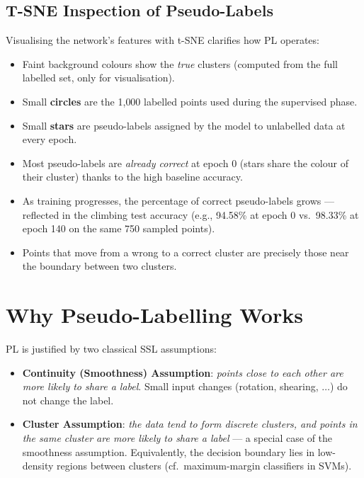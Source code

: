 \documentclass[11pt,a4paper]{article}
\theoremstyle{definition}
\theoremstyle{plain}
\theoremstyle{remark}
\begin{document}
\subsection{T-SNE Inspection of Pseudo-Labels}

Visualising the network's features with t-SNE clarifies how PL operates:
\begin{itemize}
    \item Faint background colours show the \emph{true} clusters (computed from the full labelled set, only for visualisation).
    \item Small \textbf{circles} are the 1{,}000 labelled points used during the supervised phase.
    \item Small \textbf{stars} are pseudo-labels assigned by the model to unlabelled data at every epoch.
\end{itemize}

\begin{tcolorbox}[colback=green!5!white,colframe=green!60!black,title=\textbf{Observations}]
\begin{itemize}[leftmargin=*]
    \item Most pseudo-labels are \emph{already correct} at epoch 0 (stars share the colour of their cluster) thanks to the high baseline accuracy.
    \item As training progresses, the percentage of correct pseudo-labels grows --- reflected in the climbing test accuracy (e.g., 94.58\% at epoch 0 vs.\ 98.33\% at epoch 140 on the same 750 sampled points).
    \item Points that move from a wrong to a correct cluster are precisely those near the boundary between two clusters.
\end{itemize}
\end{tcolorbox}


\section{Why Pseudo-Labelling Works}

PL is justified by two classical SSL assumptions:

\begin{tcolorbox}[colback=yellow!5!white,colframe=orange!80!black,title=\textbf{Two Key Assumptions}]
\begin{itemize}[leftmargin=*]
    \item \textbf{Continuity (Smoothness) Assumption}: \emph{points close to each other are more likely to share a label}. Small input changes (rotation, shearing, $\ldots$) do not change the label.
    \item \textbf{Cluster Assumption}: \emph{the data tend to form discrete clusters, and points in the same cluster are more likely to share a label} --- a special case of the smoothness assumption. Equivalently, the decision boundary lies in low-density regions between clusters (cf.\ maximum-margin classifiers in SVMs).
\end{itemize}
\end{tcolorbox}
\end{document}
